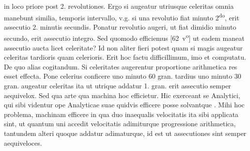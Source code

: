  in loco priore  post 2. revolutiones. Ergo si  augeatur utriusque celeritas\protect{} omnia manebunt similia,   temporis intervallo, v.g. si una revolutio fiat  minuto 2\textsuperscript{do}, erit  assecutio 2. minutis secundis.  Ponatur revolutio  augeri, ut fiat dimidio minuto secundo, erit assecutio integro. Sed quomodo  efficiemus [62~v\textsuperscript{o}] ut eadem maneat assecutio aucta licet celeritate\protect{}? Id non aliter fieri potest  quam si magis augeatur celeritas\protect{} tardioris quam celerioris. Erit  hoc factu difficillimum, imo et computatu. De quo alias cogitandum.  Si celeritates\protect{} augerentur proportione arithmetica res esset  effecta. Pone celerius conficere uno minuto 60 gran. tardius  uno minuto 30 gran. augeatur celeritas\protect{} ita ut utrique addatur 1.  gran. erit assecutio semper aequivelox. Sed qua arte qua  machina hoc efficietur. Hic exerceant se Analytici, qui sibi videntur  ope Analyticae suae quidvis efficere posse solvantque . Mihi hoc problema, machinam efficere in qua duo inaequalis velocitatis\protect{} ita  sibi applicata sint, ut quantum uni accedit velocitatis\protect{} adimiturque  progressione arithmetica, tantundem alteri quoque addatur  adimaturque, id est ut assecutiones sint semper aequiveloces.
\pend 
